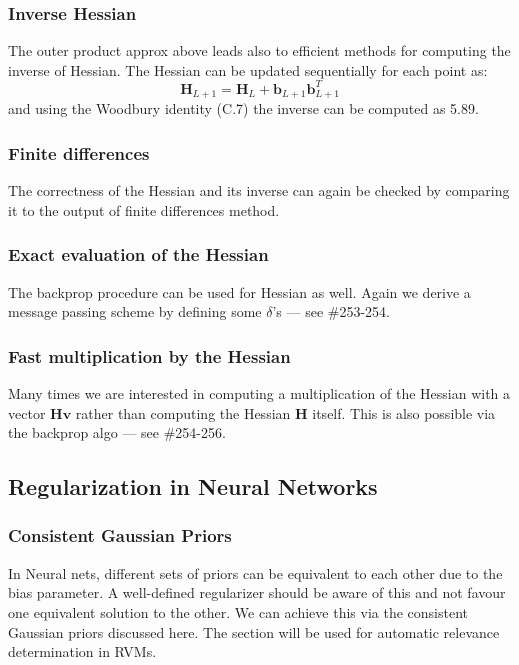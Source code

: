 \documentclass[a4paper]{article}
\newcommand{\mb}{\mathbf}
\newcommand{\bnote}[1]{#1\reversemarginpar\marginpar{{\textit{{\textcolor{blue}{#1}}}}}}
\begin{document}
\subsubsection{Inverse Hessian}
The outer product approx above leads also to efficient methods for computing the inverse of Hessian. The Hessian can be updated sequentially for each point as:
%
\begin{equation}
\mb{H}_{L+1} = \mb{H}_L+\mb{b}_{L+1}\mb{b}_{L+1}^T
\end{equation}
and using the Woodbury identity (C.7) the inverse can be computed as 5.89.

\subsubsection{Finite differences}
The correctness of the Hessian and its inverse can again be checked by comparing it to the output of finite differences method.

\subsubsection{Exact evaluation of the Hessian}
The backprop procedure can be used for Hessian as well. Again we derive a message passing scheme by defining some $\delta$'s \---- see \#253-254.

\subsubsection{Fast multiplication by the Hessian} 
Many times we are interested in computing a multiplication of the Hessian with a vector $\mb{Hv}$ rather than computing the Hessian $\mb{H}$ itself. This is also possible via the backprop algo \---- see \#254-256.

\subsection{Regularization in Neural Networks}
\subsubsection{Consistent Gaussian Priors}
In Neural nets, different sets of priors can be equivalent to each other due to the bias parameter. A well-defined regularizer should be aware of this and not favour one equivalent solution to the other. We can achieve this via the consistent Gaussian priors discussed here. The section will be used for \bnote{automatic relevance determination in RVMs}.
\end{document}
